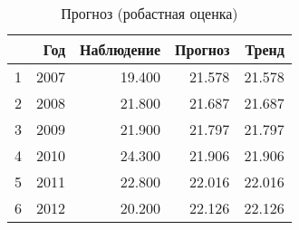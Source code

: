 \begin{table}[ht]
\centering
\begin{tabular}{rrrrr}
  \hline
 & Год & Наблюдение & Прогноз & Тренд \\ 
  \hline
1 & 2007 & 19.400 & 21.578 & 21.578 \\ 
  2 & 2008 & 21.800 & 21.687 & 21.687 \\ 
  3 & 2009 & 21.900 & 21.797 & 21.797 \\ 
  4 & 2010 & 24.300 & 21.906 & 21.906 \\ 
  5 & 2011 & 22.800 & 22.016 & 22.016 \\ 
  6 & 2012 & 20.200 & 22.126 & 22.126 \\ 
   \hline
\end{tabular}
\caption{Прогноз (робастная оценка)} 
\label{table:robust-prediction}
\end{table}
